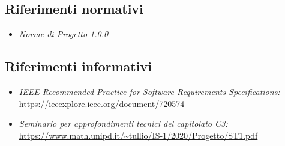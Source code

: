 \subsection{Riferimenti normativi}
\begin{itemize}
	\item \textit{Norme di Progetto 1.0.0}
\end{itemize}
\subsection{Riferimenti informativi}
\begin{itemize}
	\item \textit{IEEE Recommended Practice for Software Requirements Specifications:}\\
	\url{https://ieeexplore.ieee.org/document/720574}
	\item \textit{Seminario per approfondimenti tecnici del capitolato C3:}\\
	\url{https://www.math.unipd.it/~tullio/IS-1/2020/Progetto/ST1.pdf}		
\end{itemize}